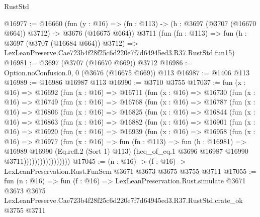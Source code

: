 \begin{lexlean}{RustStd}
\begin{coremodule}
@16977 := @16660
    (fun (y : @16) => (fn : @113) -> (h : @3697 (@3707 (@16670 @664)) @3712) -> @3676 (@16675 @664))
    @3711
    (fun (fn : @113) =>
    fun (h : @3697 (@3707 (@16684 @664)) @3712) =>
    LexLeanPreserve.Cae723b4f28f25c6d220e7f7d64945ed3.R37.RustStd.fun15)
@16981 := @3697 (@3707 (@16670 @669)) @3712
@16986 := Option.noConfusion.{0, 0} (@3676 (@16675 @669)) @113
@16987 := @1406 @113
@16989 := @16986 @16987 @113
@16990 := @3710 @3755
@17037 := fun (x : @16) =>
  @16692
    (fun (x : @16) =>
    @16711
      (fun (x : @16) =>
      @16730
        (fun (x : @16) =>
        @16749
          (fun (x : @16) =>
          @16768
            (fun (x : @16) =>
            @16787
              (fun (x : @16) =>
              @16806
                (fun (x : @16) =>
                @16825
                  (fun (x : @16) =>
                  @16844
                    (fun (x : @16) =>
                    @16863
                      (fun (x : @16) =>
                      @16882
                        (fun (x : @16) =>
                        @16901
                          (fun (x : @16) =>
                          @16920
                            (fun (x : @16) =>
                            @16939
                              (fun (x : @16) =>
                              @16958
                                (fun (x : @16) =>
                                @16977
                                  (fun (x : @16) =>
                                  fun (fn : @113) =>
                                  fun (h : @16981) =>
                                  @16989
                                    @16990
                                    (Eq.refl.{2} (Sort 1) @113)
                                    (heq_of_eq.{1} @3696 @16987 @16990 @3711)))))))))))))))))
@17045 := (n : @16) -> (f : @16) -> LexLeanPreservation.Rust.FunSem @3671 @3673 @3675 @3755 @3711
@17055 := fun (n : @16) =>
  fun (f : @16) =>
  LexLeanPreservation.Rust.simulate
    @3671
    @3673
    @3675
    LexLeanPreserve.Cae723b4f28f25c6d220e7f7d64945ed3.R37.RustStd.crate_ok
    @3755
    @3711
\end{coremodule}
\end{lexlean}
